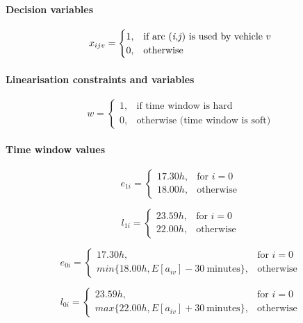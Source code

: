 \documentclass[a4paper,10pt,twoside]{report}
\begin{document}
\paragraph*{Decision variables}
\begin{equation*}
x_{ijv}=
\begin{cases}
1, & \text{if arc (\textit{i,j}) is used by vehicle }v\\
0, & \text{otherwise}
\end{cases}
\end{equation*}
\paragraph*{Linearisation constraints and variables}
\begin{equation*}
w=
\begin{cases}
1, & \text{if time window is hard}\\
0, & \text{otherwise (time window is soft)}
\end{cases}
\end{equation*}



\paragraph*{Time window values}
\begin{equation*}
e_{1i}=
\begin{cases}
17.30h, & \text{for } i=0\\
18.00h, & \text{otherwise}
\end{cases}
\end{equation*}

\begin{equation*}
l_{1i}=
\begin{cases}
23.59h, & \text{for } i=0\\
22.00h, & \text{otherwise}
\end{cases}
\end{equation*}

\begin{equation*}
e_{0i}=
\begin{cases}
17.30h, & \text{for } i=0\\
min\{18.00h, E[a_{iv}]-30\ \text{minutes}\}, & \text{otherwise}
\end{cases}
\end{equation*}

\begin{equation*}
l_{0i}=
\begin{cases}
23.59h, & \text{for } i=0\\
max\{22.00h, E[a_{iv}]+30\ \text{minutes}\}, & \text{otherwise}
\end{cases}
\end{equation*}
\end{document}
